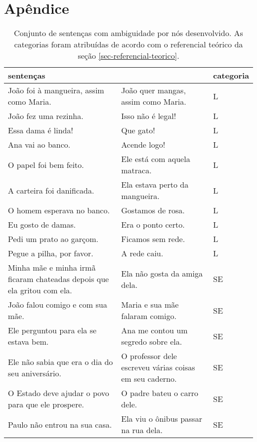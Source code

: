 \appendix
\section{Apêndice}
\label{sec-apendice}

\setlength\LTleft{-1in}
\setlength\LTright{-1in}
\begin{small}
\renewcommand{\arraystretch}{1.5}
\begin{longtable}{
    >{\raggedright\arraybackslash}p{}
    p{}
    p{}
    }
\caption{Conjunto de sentenças com ambiguidade por nós desenvolvido. As categorias foram atribuídas de acordo com o referencial teórico da seção \ref{sec-referencial-teorico}.}
\label{dataset_frases_ambiguas}
\\
\toprule
sentenças &  & categoria \\
\midrule
João foi à mangueira, assim como Maria. & João quer mangas, assim como Maria. & L \\
João fez uma rezinha. & Isso não é legal! & L \\
Essa dama é linda! & Que gato! & L \\
Ana vai ao banco. & Acende logo! & L \\
O papel foi bem feito. & Ele está com aquela matraca. & L \\
A carteira foi danificada. & Ela estava perto da mangueira. & L \\
O homem esperava no banco. & Gostamos de rosa. & L \\
Eu gosto de damas. & Era o ponto certo. & L \\
Pedi um prato ao garçom. & Ficamos sem rede. & L \\
Pegue a pilha, por favor. & A rede caiu. & L \\
Minha mãe e minha irmã ficaram chateadas depois que ela gritou com ela. & Ela não gosta da amiga dela. & SE \\
João falou comigo e com sua mãe. & Maria e sua mãe falaram comigo. & SE \\
Ele perguntou para ela se estava bem. & Ana me contou um segredo sobre ela. & SE \\
Ele não sabia que era o dia do seu aniversário. & O professor dele escreveu várias coisas em seu caderno. & SE \\ 
O Estado deve ajudar o povo para que ele prospere. & O padre bateu o carro dele. & SE \\
Paulo não entrou na sua casa. & Ela viu o ônibus passar na rua dela. & SE \\ 

\end{longtable}
\end{small}
